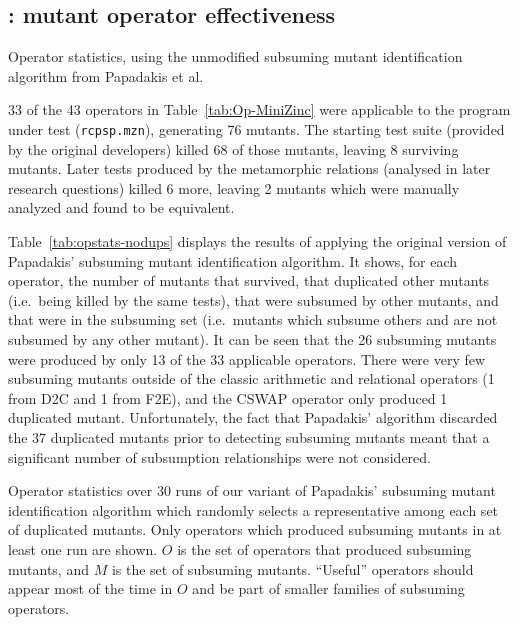 \subsection{\rqoperators: mutant operator effectiveness}

\begin{table}
    \centering
    
    \caption{Operator statistics, using the unmodified subsuming mutant identification algorithm from Papadakis et al.~\cite{papadakis_threats_2016}}
    \label{tab:opstats-nodups}
\end{table}

33 of the 43 operators in Table~\ref{tab:Op-MiniZinc} were applicable to the program under test (\texttt{rcpsp.mzn}), generating 76 mutants. The starting test suite (provided by the original developers) killed 68 of those mutants, leaving 8 surviving mutants. Later tests produced by the metamorphic relations (analysed in later research questions) killed 6 more, leaving 2 mutants which were manually analyzed and found to be equivalent.

Table~\ref{tab:opstats-nodups} displays the results of applying the original version of Papadakis' subsuming mutant identification algorithm. It shows, for each operator, the number of mutants that survived, that duplicated other mutants (i.e.\ being killed by the same tests), that were subsumed by other mutants, and that were in the subsuming set (i.e.\ mutants which subsume others and are not subsumed by any other mutant). It can be seen that the 26 subsuming mutants were produced by only 13 of the 33 applicable operators. There were very few subsuming mutants outside of the classic arithmetic and relational operators (1 from D2C and 1 from F2E), and the CSWAP operator only produced 1 duplicated mutant. Unfortunately, the fact that Papadakis' algorithm discarded the 37 duplicated mutants prior to detecting subsuming mutants meant that a significant number of subsumption relationships were not considered.

\begin{table}
    \centering
    
    \caption{Operator statistics over 30 runs of our variant of Papadakis' subsuming mutant identification algorithm which randomly selects a representative among each set of duplicated mutants. Only operators which produced subsuming mutants in at least one run are shown. $O$ is the set of operators that produced subsuming mutants, and $M$ is the set of subsuming mutants. ``Useful'' operators should appear most of the time in $O$ and be part of smaller families of subsuming operators.}
    \label{tab:opstats-dups}
\end{table}

